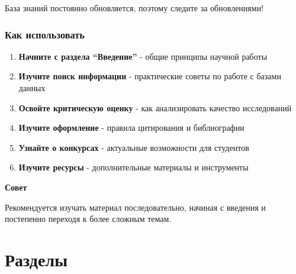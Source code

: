 \documentclass[
  russian,
  letterpaper,
]{book}
\providecommand{\tightlist}{%
  \setlength{\itemsep}{0pt}\setlength{\parskip}{0pt}}
\begin{document}
База знаний постоянно обновляется, поэтому следите за обновлениями!

\section{Как
использовать}\label{ux43aux430ux43a-ux438ux441ux43fux43eux43bux44cux437ux43eux432ux430ux442ux44c}

\begin{enumerate}
\def\labelenumi{\arabic{enumi}.}
\tightlist
\item
  \textbf{Начните с раздела ``Введение''} - общие принципы научной
  работы
\item
  \textbf{Изучите поиск информации} - практические советы по работе с
  базами данных
\item
  \textbf{Освойте критическую оценку} - как анализировать качество
  исследований
\item
  \textbf{Изучите оформление} - правила цитирования и библиографии
\item
  \textbf{Узнайте о конкурсах} - актуальные возможности для студентов
\item
  \textbf{Изучите ресурсы} - дополнительные материалы и инструменты
\end{enumerate}

\begin{tcolorbox}[enhanced jigsaw, left=2mm, bottomrule=.15mm, rightrule=.15mm, arc=.35mm, breakable, colframe=quarto-callout-tip-color-frame, leftrule=.75mm, opacityback=0, toprule=.15mm, colback=white]

\vspace{-3mm}\textbf{Совет}\vspace{3mm}

Рекомендуется изучать материал последовательно, начиная с введения и
постепенно переходя к более сложным темам.

\end{tcolorbox}

\part{Разделы}
\end{document}
